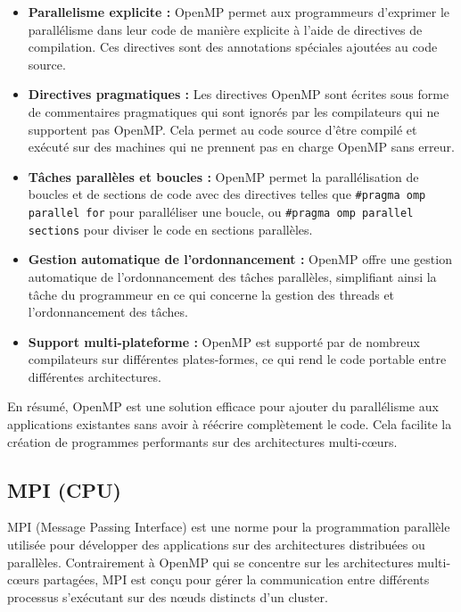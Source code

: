 \documentclass[10pt,a4paper]{article}
\begin{document}
\begin{itemize}

    \item \textbf{Parallelisme explicite :} OpenMP permet aux programmeurs d'exprimer le parallélisme dans leur code de manière explicite à l'aide de directives de compilation. Ces directives sont des annotations spéciales ajoutées au code source.
    
    \item \textbf{Directives pragmatiques :} Les directives OpenMP sont écrites sous forme de commentaires pragmatiques qui sont ignorés par les compilateurs qui ne supportent pas OpenMP. Cela permet au code source d'être compilé et exécuté sur des machines qui ne prennent pas en charge OpenMP sans erreur.
    
    \item \textbf{Tâches parallèles et boucles :} OpenMP permet la parallélisation de boucles et de sections de code avec des directives telles que \verb|#pragma omp parallel for| pour paralléliser une boucle, ou \verb|#pragma omp parallel sections| pour diviser le code en sections parallèles.
    
    \item \textbf{Gestion automatique de l'ordonnancement :} OpenMP offre une gestion automatique de l'ordonnancement des tâches parallèles, simplifiant ainsi la tâche du programmeur en ce qui concerne la gestion des threads et l'ordonnancement des tâches.
    
    \item \textbf{Support multi-plateforme :} OpenMP est supporté par de nombreux compilateurs sur différentes plates-formes, ce qui rend le code portable entre différentes architectures.

\end{itemize}


En résumé, OpenMP est une solution efficace pour ajouter du parallélisme aux applications existantes sans avoir à réécrire complètement le code. Cela facilite la création de programmes performants sur des architectures multi-cœurs.


\subsection{MPI (CPU)}


MPI (Message Passing Interface) est une norme pour la programmation parallèle utilisée pour développer des applications sur des architectures distribuées ou parallèles. Contrairement à OpenMP qui se concentre sur les architectures multi-cœurs partagées, MPI est conçu pour gérer la communication entre différents processus s'exécutant sur des nœuds distincts d'un cluster.
\end{document}
